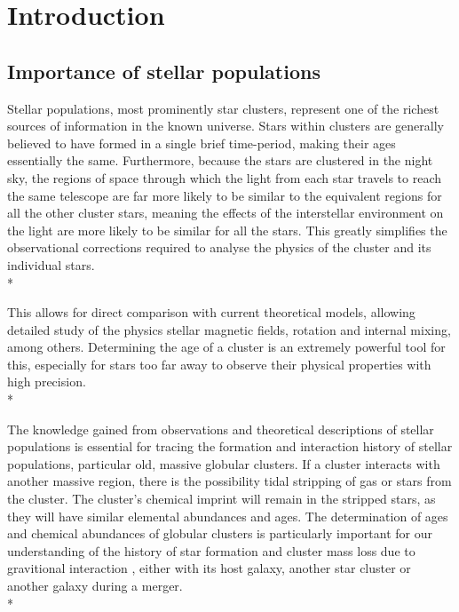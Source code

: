 \documentclass[12pt, a4paper]{report}
\begin{document}
\chapter{Introduction}
\section{Importance of stellar populations}

Stellar populations, most prominently star clusters, represent one of the richest sources of information in the known universe. Stars within clusters are generally believed to have formed in a single brief time-period, making their ages essentially the same. Furthermore, because the stars are clustered in the night sky, the regions of space through which the light from each star travels to reach the same telescope are far more likely to be similar to the equivalent regions for all the other cluster stars, meaning the effects of the interstellar environment on the light are more likely to be similar for all the stars. This greatly simplifies the observational corrections required to analyse the physics of the cluster and its individual stars. \\*

This allows for direct comparison with current theoretical models, allowing detailed study of the physics stellar magnetic fields, rotation and internal mixing, among others. Determining the age of a cluster is an extremely powerful tool for this, especially for stars too far away to observe their physical properties with high precision. \\*

The knowledge gained from observations and theoretical descriptions of stellar populations is essential for tracing the formation and interaction history of stellar populations, particular old, massive globular clusters. If a cluster interacts with another massive region, there is the possibility tidal stripping of gas or stars from the cluster. The cluster's chemical imprint will remain in the stripped stars, as they will have similar elemental abundances and ages. The determination of ages and chemical abundances of globular clusters is particularly important for our understanding of the history of star formation and cluster mass loss due to gravitional interaction \citep{2013ApJ...775..134V}, either with its host galaxy, another star cluster or another galaxy during a merger. \\*
\end{document}
